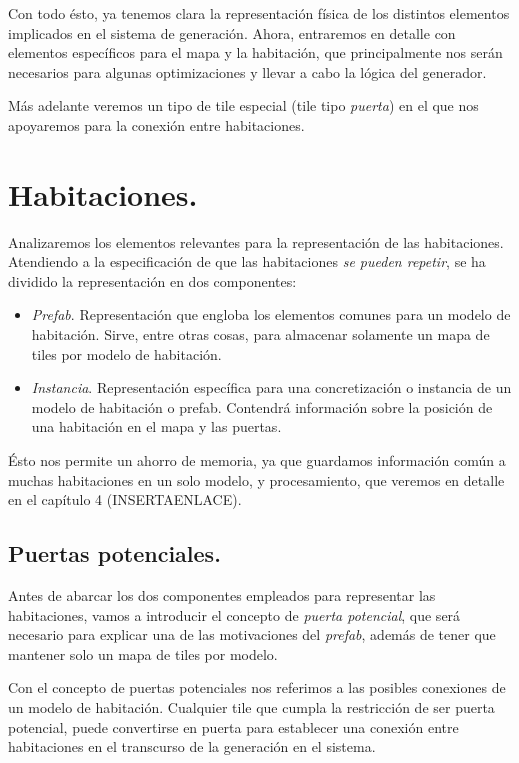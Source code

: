 Con todo ésto, ya tenemos clara la representación física de los distintos elementos implicados en el sistema de generación. Ahora, entraremos en detalle con elementos específicos para el mapa y la habitación, que principalmente nos serán necesarios para algunas optimizaciones y llevar a cabo la lógica del generador.

Más adelante veremos un tipo de tile especial (tile tipo \emph{puerta}) en el que nos apoyaremos para la conexión entre habitaciones.

\section{Habitaciones.}

Analizaremos los elementos relevantes para la representación de las habitaciones. Atendiendo a la especificación de que las habitaciones \emph{se pueden repetir}, se ha dividido la representación en dos componentes:

\begin{itemize}
	\item \emph{Prefab}. Representación que engloba los elementos comunes para un modelo de habitación. Sirve, entre otras cosas, para almacenar solamente un mapa de tiles por modelo de habitación.
	\item \emph{Instancia}. Representación específica para una concretización o instancia de un modelo de habitación o prefab. Contendrá información sobre la posición de una habitación en el mapa y las puertas.
\end{itemize}

Ésto nos permite un ahorro de memoria, ya que guardamos información común a muchas habitaciones en un solo modelo, y procesamiento, que veremos en detalle en el capítulo 4 (INSERTAENLACE).

\subsection{Puertas potenciales.}

Antes de abarcar los dos componentes empleados para representar las habitaciones, vamos a introducir el concepto de \emph{puerta potencial}, que será necesario para explicar una de las motivaciones del \emph{prefab}, además de tener que mantener solo un mapa de tiles por modelo.

Con el concepto de puertas potenciales nos referimos a las posibles conexiones de un modelo de habitación. Cualquier tile que cumpla la restricción de ser puerta potencial, puede convertirse en puerta para establecer una conexión entre habitaciones en el transcurso de la generación en el sistema.

